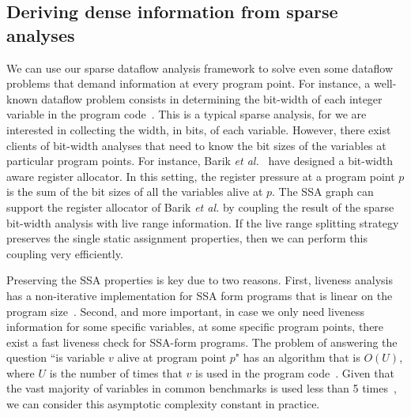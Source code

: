 \subsection{Deriving dense information from sparse analyses}
\label{sub:ssi:dense}

We can use our sparse dataflow analysis framework to solve even some dataflow
problems that demand information at every program point.
For instance, a well-known dataflow problem consists in determining the
bit-width of each integer variable in the program
code~\cite{Mahlke01,Stephenson00,Gawlitza09,Su04}.
This is a typical sparse analysis, for we are interested in collecting the
width, in bits, of each variable.
However, there exist clients of bit-width analyses that need to know the bit
sizes of the variables at particular program points.
For instance, Barik {\em et al.}~\cite{Barik06} have designed a bit-width
aware register allocator.
In this setting, the register pressure at a program point $p$ is the sum of
the bit sizes of all the variables alive at $p$.
The SSA graph can support the register allocator of Barik {\em et al.} by
coupling the result of the sparse bit-width analysis with live range information.
If the live range splitting strategy preserves the single static
assignment properties, then we can perform this coupling very efficiently.

Preserving the SSA properties is key due to two reasons.
First, liveness analysis has a non-iterative implementation for SSA form
programs that is linear on the program size~\cite[p.429]{Appel02}.
Second, and more important, in case we only need liveness information for some
specific variables, at some specific program points, there exist a fast
liveness check for SSA-form programs.
The problem of answering the question ``is variable $v$ alive at program point
$p$" has an algorithm that is $O(U)$, where $U$ is the number of times that $v$
is used in the program code~\cite{Benoit08}.
Given that the vast majority of variables in common benchmarks is used less
than 5 times~\cite{Benoit08}, we can consider this asymptotic complexity
constant in practice.